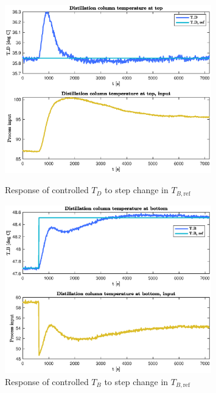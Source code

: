 \documentclass[12pt]{article}
\begin{document}
\begin{figure}[p]
\centering
\includegraphics[width=0.8\textwidth]{../Systemanalyse/Log_Data_to_Matlab/Figurer/LV_tuning/T_D_closed_loop_with_T_B_step.eps}
\caption{Response of controlled $T_D$ to step change in $T_{B, \textrm{ref}}$}
\label{fig:TD_TB_cl}

\includegraphics[width=0.8\textwidth]{../Systemanalyse/Log_Data_to_Matlab/Figurer/LV_tuning/T_B_closed_loop_with_T_B_step.eps}
\caption{Response of controlled $T_B$ to step change in $T_{B, \textrm{ref}}$}
\label{fig:TB_TB_cl}
\end{figure}
\end{document}

